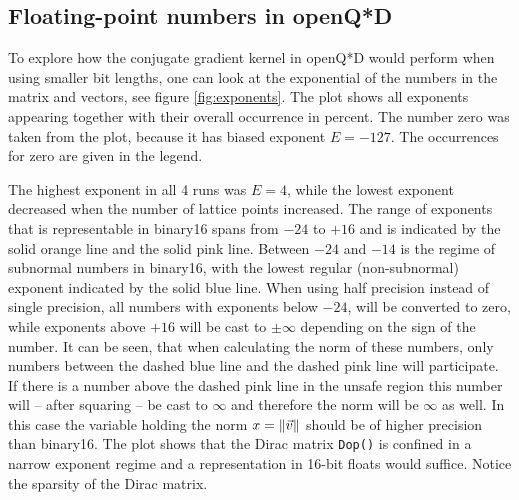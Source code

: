 \documentclass{article}
\theoremstyle{plain} %
\theoremstyle{convention} %
\theoremstyle{remark} %
\def\code#1{\texttt{#1}}
\numberwithin{equation}{section}
\begin{document}
\begin{figure}
    \label{fig:number_line}
\end{figure}

\subsection{Floating-point numbers in openQ*D}

To explore how the conjugate gradient kernel in openQ*D would perform when using smaller bit lengths, one can look at the exponential of the numbers in the matrix and vectors, see figure \ref{fig:exponents}. The plot shows all exponents appearing together with their overall occurrence in percent. The number zero was taken from the plot, because it has biased exponent $E=-127$. The occurrences for zero are given in the legend.

The highest exponent in all 4 runs was $E=4$, while the lowest exponent decreased when the number of lattice points increased. The range of exponents that is representable in \gls{binary16} spans from \textcolor{corange}{$-24$} to \textcolor{cpink}{$+16$} and is indicated by the \textcolor{corange}{solid orange line} and the \textcolor{cpink}{solid pink line}. Between \textcolor{corange}{$-24$} and \textcolor{cblue}{$-14$} is the regime of subnormal numbers in \gls{binary16}, with the lowest regular (non-subnormal) exponent indicated by the \textcolor{cblue}{solid blue line}. When using half precision instead of single precision, all numbers with exponents below \textcolor{corange}{$-24$}, will be converted to zero, while exponents above \textcolor{cpink}{$+16$} will be cast to $\pm \infty$ depending on the sign of the number. It can be seen, that when calculating the norm of these numbers, only numbers between the \textcolor{cblue}{dashed blue line} and the \textcolor{cpink}{dashed pink line} will participate. If there is a number above the dashed pink line in the \textcolor{cyellow}{unsafe region} this number will -- after squaring -- be cast to $\infty$ and therefore the norm will be $\infty$ as well\footnotemark. In this case the variable holding the norm $x = \norm{\vec{v}}$ should be of higher precision than \gls{binary16}. The plot shows that the Dirac matrix \code{Dop()} is confined in a narrow exponent regime and a representation in 16-bit floats would suffice. Notice the sparsity of the Dirac matrix.

\end{document}
